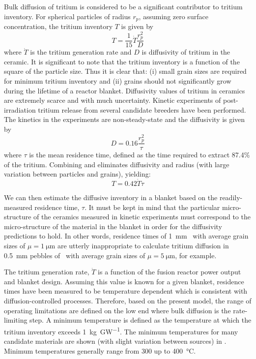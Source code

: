Bulk diffusion of tritium is considered to be a significant contributor to tritium inventory. For spherical particles of radius $r_p$, assuming zero surface concentration, the tritium inventory $T$ is given by 
\begin{equation}\label{eq:inventory-diff}
T = \frac{1}{15}\dot{T}\frac{r_p^2}{D}
\end{equation}
where $\dot{T}$ is the tritium generation rate and $D$ is diffusivity of tritium in the ceramic. It is significant to note that the tritium inventory is a function of the square of the particle size. Thus it is clear that: (i) small grain sizes are required for minimum tritium inventory and (ii) grains should not significantly grow during the lifetime of a reactor blanket. Diffusivity values of tritium in ceramics are extremely scarce and with much uncertainty. Kinetic experiments of post-irradiation tritium release from several candidate breeders have been performed. The kinetics in the experiments are non-steady-state and the diffusivity is given by 
\begin{equation}\label{eq:exp-diff}
D = 0.16 \frac{r_p^2}{\tau}
\end{equation}
where $\tau$ is the mean residence time, defined as the time required to extract 87.4\% of the tritium. Combining  and  eliminates diffusivity and radius (with large variation between particles and grains), yielding:
\begin{equation}
T = 0.42 \dot{T}\tau
\end{equation}

We can then estimate the diffusive inventory in a blanket based on the readily-measured residence time, $\tau$. It must be kept in mind that the particular micro-structure of the ceramics measured in kinetic experiments must correspond to the micro-structure of the material in the blanket in order for the diffusivity predictions to hold. In other words, residence times of \SI{1}{\milli\meter} \lit~with average grain sizes of $\mu = \SI{1}{\micro\meter}$ are utterly inappropriate to calculate tritium diffusion in \SI{0.5}{\milli\meter} pebbles of \lis~with average grain sizes of $\mu = \SI{5}{\micro\meter}$, for example.

The tritium generation rate, $\dot{T}$ is a function of the fusion reactor power output and blanket design. Assuming this value is known for a given blanket, residence times have been measured to be temperature dependent which is consistent with diffusion-controlled processes. Therefore, based on the present model, the range of operating limitations are defined on the low end where bulk diffusion is the rate-limiting step. A minimum temperature is defined as the temperature at which the tritium inventory exceeds \SI{1}{\kilo\gram\per\giga\watt}. The minimum temperatures for many candidate materials are shown (with slight variation between sources) in . Minimum temperatures generally range from 300 up to \SI{400}{\celsius}.

